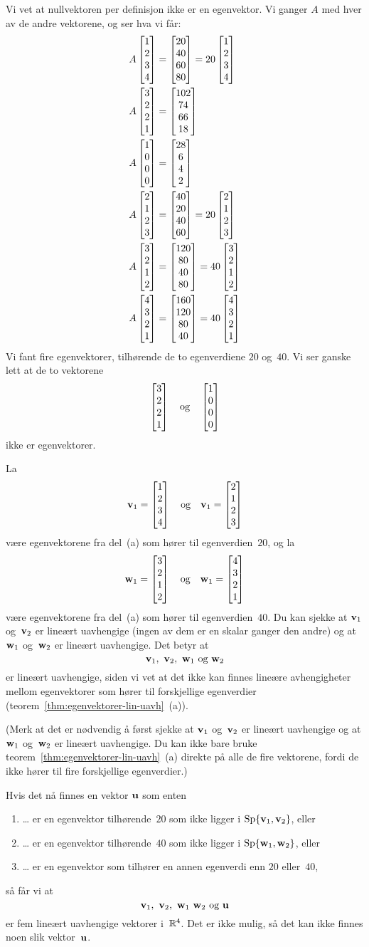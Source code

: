 \begin{losning}
\begin{punkt}
Vi vet at nullvektoren per definisjon ikke er en egenvektor.  Vi
ganger $A$ med hver av de andre vektorene, og ser hva vi får:
\begin{align*}
A \begin{bmatrix} 1 \\ 2 \\ 3 \\ 4 \end{bmatrix} &= \begin{bmatrix} 20 \\ 40 \\ 60 \\ 80 \end{bmatrix} = 20 \begin{bmatrix} 1 \\ 2 \\ 3 \\ 4 \end{bmatrix} \\
A \begin{bmatrix} 3 \\ 2 \\ 2 \\ 1 \end{bmatrix} &= \begin{bmatrix} 102 \\ 74 \\ 66 \\ 18 \end{bmatrix} \\
A \begin{bmatrix} 1 \\ 0 \\ 0 \\ 0 \end{bmatrix} &= \begin{bmatrix} 28 \\ 6 \\ 4 \\ 2 \end{bmatrix} \\
A \begin{bmatrix} 2 \\ 1 \\ 2 \\ 3 \end{bmatrix} &= \begin{bmatrix} 40 \\ 20 \\ 40 \\ 60 \end{bmatrix} = 20 \begin{bmatrix} 2 \\ 1 \\ 2 \\ 3 \end{bmatrix} \\
A \begin{bmatrix} 3 \\ 2 \\ 1 \\ 2 \end{bmatrix} &= \begin{bmatrix} 120 \\ 80 \\ 40 \\ 80 \end{bmatrix} = 40 \begin{bmatrix} 3 \\ 2 \\ 1 \\ 2 \end{bmatrix} \\
A \begin{bmatrix} 4 \\ 3 \\ 2 \\ 1 \end{bmatrix} &= \begin{bmatrix} 160 \\ 120 \\ 80 \\ 40 \end{bmatrix} = 40 \begin{bmatrix} 4 \\ 3 \\ 2 \\ 1 \end{bmatrix}
\end{align*}
Vi fant fire egenvektorer, tilhørende de to egenverdiene $20$ og~$40$.
Vi ser ganske lett at de to vektorene
\[
\begin{bmatrix} 3 \\ 2 \\ 2 \\ 1 \end{bmatrix}
\quad\text{og}\quad\begin{bmatrix} 1 \\ 0 \\ 0 \\ 0 \end{bmatrix}
\]
ikke er egenvektorer.
\end{punkt}
\begin{punkt}
La
\[
\mathbf{v}_1 = \begin{bmatrix} 1 \\ 2 \\ 3 \\ 4 \end{bmatrix}
\quad\text{og}\quad
\mathbf{v}_1 = \begin{bmatrix} 2 \\ 1 \\ 2 \\ 3 \end{bmatrix}
\]
være egenvektorene fra del~(a) som hører til egenverdien~$20$, og la
\[
\mathbf{w}_1 = \begin{bmatrix} 3 \\ 2 \\ 1 \\ 2 \end{bmatrix}
\quad\text{og}\quad
\mathbf{w}_1 = \begin{bmatrix} 4 \\ 3 \\ 2 \\ 1 \end{bmatrix}
\]
være egenvektorene fra del~(a) som hører til egenverdien~$40$.  Du kan
sjekke at $\mathbf{v}_1$ og~$\mathbf{v}_2$ er lineært uavhengige (ingen av dem
er en skalar ganger den andre) og at $\mathbf{w}_1$ og~$\mathbf{w}_2$ er lineært
uavhengige.  Det betyr at
\[
\V{v}_1,\ \V{v}_2,\ \V{w}_1\ \text{og}\ \V{w}_2
\]
er lineært uavhengige, siden vi vet at det ikke kan finnes lineære
avhengigheter mellom egenvektorer som hører til forskjellige
egenverdier (teorem~\ref{thm:egenvektorer-lin-uavh}~(a)).

(Merk at det er nødvendig å først sjekke at $\mathbf{v}_1$ og~$\mathbf{v}_2$ er
lineært uavhengige og at $\mathbf{w}_1$ og~$\mathbf{w}_2$ er lineært uavhengige.
Du kan ikke bare bruke teorem~\ref{thm:egenvektorer-lin-uavh}~(a)
direkte på alle de fire vektorene, fordi de ikke hører til fire
forskjellige egenverdier.)

Hvis det nå finnes en vektor $\mathbf{u}$ som enten
\begin{enumerate}
\item \ldots{} er en egenvektor tilhørende~$20$ som ikke ligger i
$\operatorname{Sp} \{ \mathbf{v}_1, \mathbf{v}_2 \}$, eller
\item \ldots{} er en egenvektor tilhørende~$40$ som ikke ligger i
$\operatorname{Sp} \{ \mathbf{w}_1, \mathbf{w}_2 \}$, eller
\item \ldots{} er en egenvektor som tilhører en annen egenverdi enn
$20$ eller~$40$,
\end{enumerate}
så får vi at
\[
\V{v}_1,\ \V{v}_2,\ \V{w}_1\ \V{w}_2\ \text{og}\ \V{u}
\]
er fem lineært uavhengige vektorer i~$\mathbb{R}^4$.  Det er ikke mulig, så
det kan ikke finnes noen slik vektor~$\mathbf{u}$.


\end{punkt}
\end{losning}

